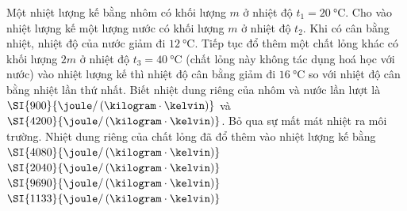 \begin{ex}
	Một nhiệt lượng kế bằng nhôm có khối lượng $m$ ở nhiệt độ $t_1=\SI{20}{\celsius}$. Cho vào nhiệt lượng kế một lượng nước có khối lượng $m$ ở nhiệt độ $t_2$. Khi có cân bằng nhiệt, nhiệt độ của nước giảm đi $\SI{12}{\celsius}$. Tiếp tục đổ thêm một chất lỏng khác có khối lượng $2m$ ở nhiệt độ $t_3=\SI{40}{\celsius}$ (chất lỏng này không tác dụng hoá học với nước) vào nhiệt lượng kế thì nhiệt độ cân bằng giảm đi $\SI{16}{\celsius}$ so với nhiệt độ cân bằng nhiệt lần thứ nhất. Biết nhiệt dung riêng của nhôm và nước lần lượt là $\SI{900}{\joule/\left(\kilogram\cdot\kelvin\right)}$ và $\SI{4200}{\joule/\left(\kilogram\cdot\kelvin\right)}$. Bỏ qua sự mất mát nhiệt ra môi trường. Nhiệt dung riêng của chất lỏng đã đổ thêm vào nhiệt lượng kế bằng	
	\choice
	{$\SI{4080}{\joule/\left(\kilogram\cdot\kelvin\right)}$}
	{\True $\SI{2040}{\joule/\left(\kilogram\cdot\kelvin\right)}$}
	{$\SI{9690}{\joule/\left(\kilogram\cdot\kelvin\right)}$}
	{$\SI{1133}{\joule/\left(\kilogram\cdot\kelvin\right)}$}
\end{ex}
